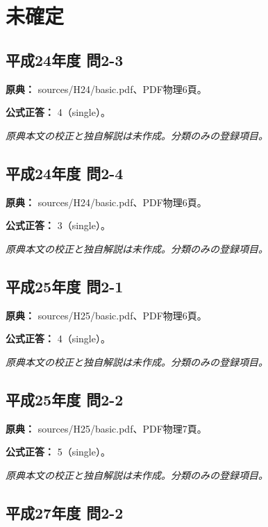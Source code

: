 \section{未確定}

\subsection{平成24年度 問2-3}
\label{q:h24-reg-basic-2-3}

\noindent\textbf{原典：} sources/H24/basic.pdf、PDF物理6頁。

\textbf{公式正答：} 4（single）。

\par\textit{原典本文の校正と独自解説は未作成。分類のみの登録項目。}

\subsection{平成24年度 問2-4}
\label{q:h24-reg-basic-2-4}

\noindent\textbf{原典：} sources/H24/basic.pdf、PDF物理6頁。

\textbf{公式正答：} 3（single）。

\par\textit{原典本文の校正と独自解説は未作成。分類のみの登録項目。}

\subsection{平成25年度 問2-1}
\label{q:h25-reg-basic-2-1}

\noindent\textbf{原典：} sources/H25/basic.pdf、PDF物理6頁。

\textbf{公式正答：} 4（single）。

\par\textit{原典本文の校正と独自解説は未作成。分類のみの登録項目。}

\subsection{平成25年度 問2-2}
\label{q:h25-reg-basic-2-2}

\noindent\textbf{原典：} sources/H25/basic.pdf、PDF物理7頁。

\textbf{公式正答：} 5（single）。

\par\textit{原典本文の校正と独自解説は未作成。分類のみの登録項目。}

\subsection{平成27年度 問2-2}
\label{q:h27-reg-basic-2-2}


